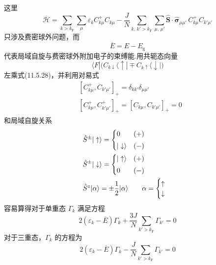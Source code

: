这里
\begin{equation}
  \overline{\mathscr{H}}
  =\sum_{k>k_{\mathrm{F}}}\sum_{\mu}\varepsilon_{k}C^{+}_{k\mu}C_{k\mu}
  -\frac{J}{N}\sum_{k,\,k'>k_{\mathrm{F}}}\sum_{\mu,\,\mu'}
  \hat{\boldsymbol{S}}\cdot\hat{\boldsymbol{\sigma}}_{\mu\mu'}\,
  C^{+}_{k\mu}C_{k'\mu'}
\end{equation}
只涉及费密球外问题，而
\begin{equation}
  \overline{E}=E-E_{\mathrm{g}}
\end{equation}
代表局域自旋与费密球外附加电子的束缚能.用共轭态向量
\begin{equation*}
  \langle F|\bigl(C_{k\downarrow}\langle\uparrow|
  \mp C_{k\uparrow}\langle\downarrow|\bigr)
\end{equation*}
左乘式(11.5.28)，并利用对易式
\begin{equation}
\begin{aligned}
  &[C^{+}_{k\mu},C_{k'\mu'}]_{+}=\delta_{kk'}\delta_{\mu\mu'}\\
  &[C^{+}_{k\mu},C^{+}_{k'\mu'}]_{+}
  =[C_{k\mu},C_{k'\mu'}]_{+}=0
\end{aligned}
\end{equation}
和局域自旋关系
\begin{equation}
\begin{aligned}
  &\hat{S}^{\pm}|\uparrow\rangle
  =\begin{cases}0&(+)\smallskip\\|\downarrow\rangle&(-)\end{cases}\\
  &\hat{S}^{\pm}|\downarrow\rangle
  =\begin{cases}|\uparrow\rangle&(+)\smallskip\\0&(-)\end{cases}\\
  &\hat{S}^{z}|\alpha\rangle=\pm\frac{1}{2}|\alpha\rangle
  \qquad\alpha=\begin{cases}\uparrow\\\downarrow\end{cases}
\end{aligned}
\end{equation}
容易算得对于单重态 $\Gamma_{k}$ 满足方程
\begin{equation}
  2(\varepsilon_{k}-\overline{E})\Gamma_{k}
  +\frac{3J}{N}\sum_{k'>k_{\mathrm{F}}}\Gamma_{k'}=0
\end{equation}
对于三重态，$\Gamma_{k}$ 的方程为
\begin{equation}
  2(\varepsilon_{k}-\overline{E})\Gamma_{k}
  -\frac{J}{N}\sum_{k'>k_{\mathrm{F}}}\Gamma_{k'}=0
\end{equation}
